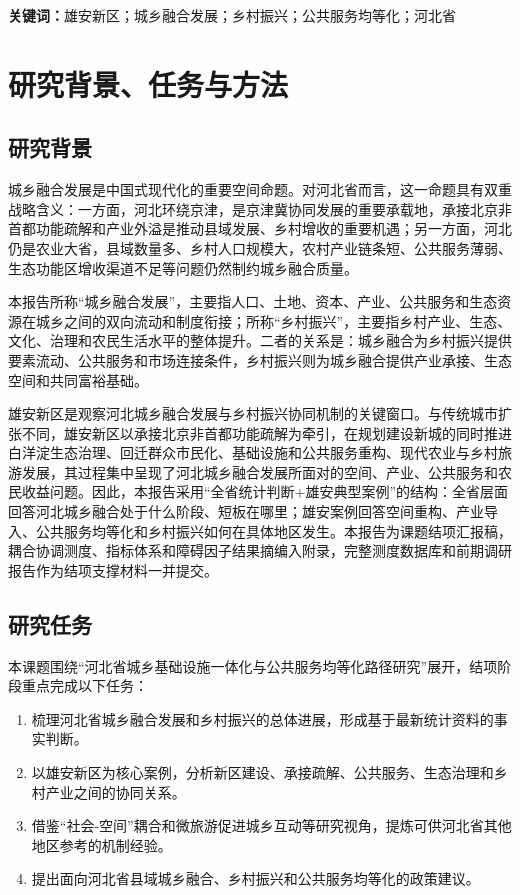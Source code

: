 \documentclass[UTF8,zihao=-4]{ctexart}
\begin{document}
\textbf{关键词：}雄安新区；城乡融合发展；乡村振兴；公共服务均等化；河北省

\section{研究背景、任务与方法}

\subsection{研究背景}

城乡融合发展是中国式现代化的重要空间命题。对河北省而言，这一命题具有双重战略含义：一方面，河北环绕京津，是京津冀协同发展的重要承载地，承接北京非首都功能疏解和产业外溢是推动县域发展、乡村增收的重要机遇；另一方面，河北仍是农业大省，县域数量多、乡村人口规模大，农村产业链条短、公共服务薄弱、生态功能区增收渠道不足等问题仍然制约城乡融合质量。

本报告所称“城乡融合发展”，主要指人口、土地、资本、产业、公共服务和生态资源在城乡之间的双向流动和制度衔接；所称“乡村振兴”，主要指乡村产业、生态、文化、治理和农民生活水平的整体提升。二者的关系是：城乡融合为乡村振兴提供要素流动、公共服务和市场连接条件，乡村振兴则为城乡融合提供产业承接、生态空间和共同富裕基础。

雄安新区是观察河北城乡融合发展与乡村振兴协同机制的关键窗口。与传统城市扩张不同，雄安新区以承接北京非首都功能疏解为牵引，在规划建设新城的同时推进白洋淀生态治理、回迁群众市民化、基础设施和公共服务重构、现代农业与乡村旅游发展，其过程集中呈现了河北城乡融合发展所面对的空间、产业、公共服务和农民收益问题。因此，本报告采用“全省统计判断+雄安典型案例”的结构：全省层面回答河北城乡融合处于什么阶段、短板在哪里；雄安案例回答空间重构、产业导入、公共服务均等化和乡村振兴如何在具体地区发生。本报告为课题结项汇报稿，耦合协调测度、指标体系和障碍因子结果摘编入附录，完整测度数据库和前期调研报告作为结项支撑材料一并提交。

\subsection{研究任务}

本课题围绕“河北省城乡基础设施一体化与公共服务均等化路径研究”展开，结项阶段重点完成以下任务：

\begin{enumerate}
    \item 梳理河北省城乡融合发展和乡村振兴的总体进展，形成基于最新统计资料的事实判断。
    \item 以雄安新区为核心案例，分析新区建设、承接疏解、公共服务、生态治理和乡村产业之间的协同关系。
    \item 借鉴“社会-空间”耦合和微旅游促进城乡互动等研究视角，提炼可供河北省其他地区参考的机制经验。
    \item 提出面向河北省县域城乡融合、乡村振兴和公共服务均等化的政策建议。
\end{enumerate}
\end{document}
